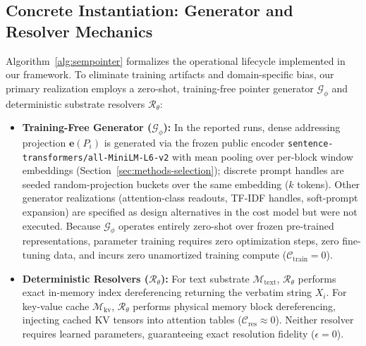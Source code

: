\documentclass[runningheads]{llncs}
\begin{document}
\subsection{Concrete Instantiation: Generator and Resolver Mechanics}
Algorithm~\ref{alg:sempointer} formalizes the operational lifecycle implemented in our framework. To eliminate training artifacts and domain-specific bias, our primary realization employs a zero-shot, training-free pointer generator $\mathcal{G}_\phi$ and deterministic substrate resolvers $\mathcal{R}_\theta$:
\begin{itemize}\setlength{\itemsep}{0.5pt}\setlength{\parsep}{0pt}\setlength{\topsep}{1pt}
    \item \textbf{Training-Free Generator ($\mathcal{G}_\phi$):} In the reported runs, dense addressing projection $\mathbf{e}(P_i)$ is generated via the frozen public encoder \texttt{sentence-transformers/all-MiniLM-L6-v2} with mean pooling over per-block window embeddings (Section~\ref{sec:methods-selection}); discrete prompt handles are seeded random-projection buckets over the same embedding ($k$ tokens). Other generator realizations (attention-class readouts, TF-IDF handles, soft-prompt expansion) are specified as design alternatives in the cost model but were not executed. Because $\mathcal{G}_\phi$ operates entirely zero-shot over frozen pre-trained representations, parameter training requires zero optimization steps, zero fine-tuning data, and incurs zero unamortized training compute ($\mathcal{C}_{\mathrm{train}}=0$).
    \item \textbf{Deterministic Resolvers ($\mathcal{R}_\theta$):} For text substrate $\mathcal{M}_{\mathrm{text}}$, $\mathcal{R}_\theta$ performs exact in-memory index dereferencing returning the verbatim string $X_i$. For key-value cache $\mathcal{M}_{\mathrm{kv}}$, $\mathcal{R}_\theta$ performs physical memory block dereferencing, injecting cached KV tensors into attention tables ($\mathcal{C}_{\mathrm{res}} \approx 0$). Neither resolver requires learned parameters, guaranteeing exact resolution fidelity ($\epsilon=0$).
\end{itemize}
\end{document}
